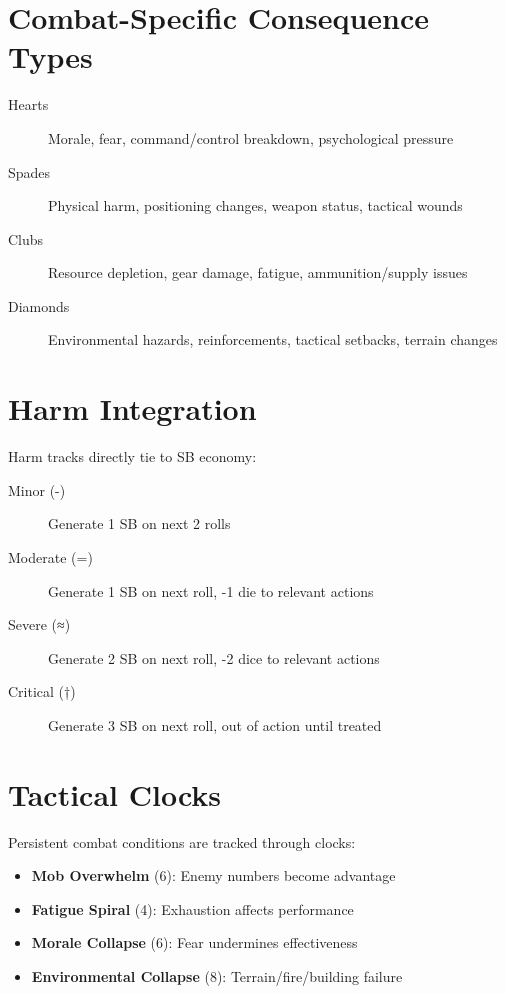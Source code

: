 \section{Combat-Specific Consequence Types}
\begin{description}
\item[Hearts] Morale, fear, command/control breakdown, psychological pressure
\item[Spades] Physical harm, positioning changes, weapon status, tactical wounds
\item[Clubs] Resource depletion, gear damage, fatigue, ammunition/supply issues
\item[Diamonds] Environmental hazards, reinforcements, tactical setbacks, terrain changes
\end{description}

\section{Harm Integration}
Harm tracks directly tie to SB economy:
\begin{description}
\item[Minor (-)] Generate 1 SB on next 2 rolls
\item[Moderate (=)] Generate 1 SB on next roll, -1 die to relevant actions
\item[Severe (≈)] Generate 2 SB on next roll, -2 dice to relevant actions  
\item[Critical (†)] Generate 3 SB on next roll, out of action until treated
\end{description}

\section{Tactical Clocks}
Persistent combat conditions are tracked through clocks:
\begin{itemize}
    \item \textbf{Mob Overwhelm} (6): Enemy numbers become advantage
    \item \textbf{Fatigue Spiral} (4): Exhaustion affects performance
    \item \textbf{Morale Collapse} (6): Fear undermines effectiveness
    \item \textbf{Environmental Collapse} (8): Terrain/fire/building failure
\end{itemize}

